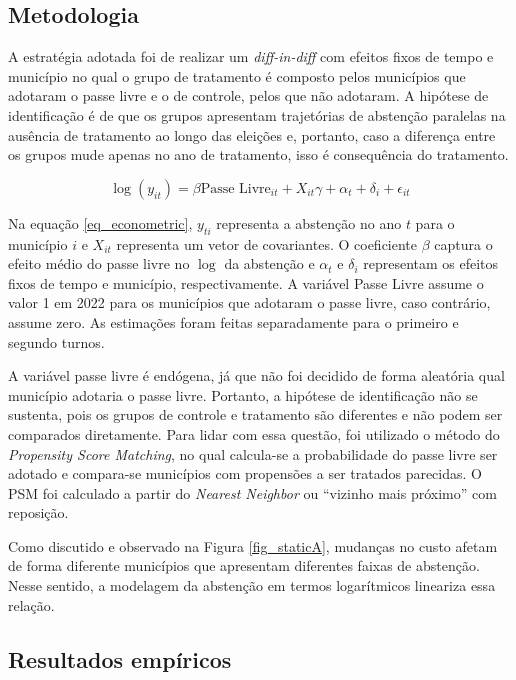 \subsection{Metodologia}

A estratégia adotada foi de realizar um \textit{diff-in-diff} com efeitos fixos de tempo e município no qual o grupo de tratamento é composto pelos municípios que adotaram o passe livre e o de controle, pelos que não adotaram. A hipótese de identificação é de que os grupos apresentam trajetórias de abstenção paralelas na ausência de tratamento ao longo das eleições e, portanto, caso a diferença entre os grupos mude apenas no ano de tratamento, isso é consequência do tratamento.

\begin{equation}
\label{eq_econometric}
    \log{(y_{it})}=\beta\text{Passe Livre}_{it} + X_{it}\gamma + \alpha_t + \delta_i + \epsilon_{it}
\end{equation}

Na equação \ref{eq_econometric}, $y_{ti}$ representa a abstenção no ano $t$ para o município $i$ e $X_{it}$ representa um vetor de covariantes. O coeficiente $\beta$ captura o efeito médio do passe livre no $\log$ da abstenção e $\alpha_t$ e $\delta_i$ representam os efeitos fixos de tempo e município, respectivamente. A variável Passe Livre assume o valor 1 em 2022 para os municípios que adotaram o passe livre, caso contrário, assume zero. As estimações foram feitas separadamente para o primeiro e segundo turnos. 

A variável passe livre é endógena, já que não foi decidido de forma aleatória qual município adotaria o passe livre. Portanto, a hipótese de identificação não se sustenta, pois os grupos de controle e tratamento são diferentes e não podem ser comparados diretamente. Para lidar com essa questão, foi utilizado o método do \textit{Propensity Score Matching}, no qual calcula-se a probabilidade do passe livre ser adotado e compara-se municípios com propensões a ser tratados parecidas. O PSM foi calculado a partir do \textit{Nearest Neighbor} ou ``vizinho mais próximo'' com reposição.

Como discutido e observado na Figura \ref{fig_staticA}, mudanças no custo afetam de forma diferente municípios que apresentam diferentes faixas de abstenção. Nesse sentido, a modelagem da abstenção em termos logarítmicos lineariza essa relação.

\subsection{Resultados empíricos}
\label{subsec_resEmp}

